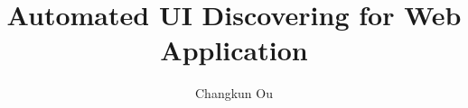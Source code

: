 \documentclass[11pt,a4paper,twoside]{article}
\title{Automated UI Discovering for Web Application}
\author{Changkun Ou}
\begin{document}
\makecover
\makeaufgabenstellung
\makededication
\makeabstract
\maketoc












\end{document}
